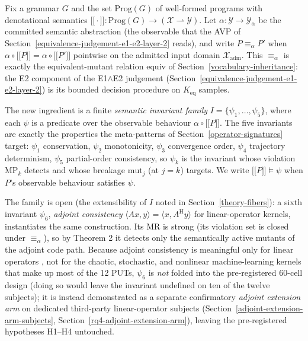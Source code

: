 \documentclass[12pt]{article}
\providecommand{\llbracket}{\mathopen{\lbrack\!\lbrack}}
\providecommand{\rrbracket}{\mathclose{\rbrack\!\rbrack}}
\begin{document}
Fix a grammar $G$ and the set $\mathrm{Prog}(G)$ of well-formed programs
with denotational semantics
$\llbracket\cdot\rrbracket : \mathrm{Prog}(G) \to (\mathcal{X} \rightharpoonup \mathcal{Y})$.
Let $\alpha : \mathcal{Y} \to \mathcal{Y}_\alpha$ be the committed
semantic abstraction (the observable that the AVP of Section~\ref{equivalence-judgement-e1-e2-layer-2} reads), and
write $P \equiv_\alpha P'$ when
$\alpha \circ \llbracket P \rrbracket = \alpha \circ \llbracket P' \rrbracket$
pointwise on the admitted input domain $\mathcal{X}_{\mathrm{adm}}$.
This $\equiv_\alpha$ is exactly the equivalent-mutant relation
$\mathrm{equiv}$ of Section~\ref{vocabulary-inheritance}: the E2 component of the E1$\wedge$E2 judgement
(Section~\ref{equivalence-judgement-e1-e2-layer-2}) is its bounded decision procedure on $K_{\mathrm{eq}}$ samples.

The new ingredient is a finite \emph{semantic invariant family}
$I = \{\psi_1, \dots, \psi_5\}$, where each $\psi$ is a predicate over
the observable behaviour $\alpha \circ \llbracket P \rrbracket$. The five
invariants are exactly the properties the meta-patterns of Section~\ref{operator-signatures} target:
$\psi_1$ conservation, $\psi_2$ monotonicity, $\psi_3$ convergence order,
$\psi_4$ trajectory determinism, $\psi_5$ partial-order consistency, so
$\psi_k$ is the invariant whose violation MP$_k$ detects and whose
breakage $\mathrm{mut}_j$ (at $j=k$) targets. We write
$\llbracket P \rrbracket \models \psi$ when $P$'s observable behaviour
satisfies $\psi$.

The family is open (the extensibility of $I$ noted in Section~\ref{theory-fibers}): a sixth
invariant $\psi_6$, \emph{adjoint consistency}
$\langle A x, y\rangle = \langle x, A^{\mathrm{H}} y\rangle$ for
linear-operator kernels, instantiates the same construction. Its MR is
strong (its violation set is closed under $\equiv_\alpha$), so by Theorem
2 it detects only the semantically active mutants of the adjoint code
path. Because adjoint consistency is meaningful only for linear operators
, not for the chaotic, stochastic, and nonlinear machine-learning
kernels that make up most of the 12 PUTs, $\psi_6$ is \emph{not} folded
into the pre-registered 60-cell design (doing so would leave the invariant
undefined on ten of the twelve subjects); it is instead demonstrated as a
separate confirmatory \emph{adjoint extension arm} on dedicated
third-party linear-operator subjects (Section~\ref{adjoint-extension-arm-subjects}, Section~\ref{rq4-adjoint-extension-arm}), leaving the
pre-registered hypotheses H1--H4 untouched.
\end{document}
